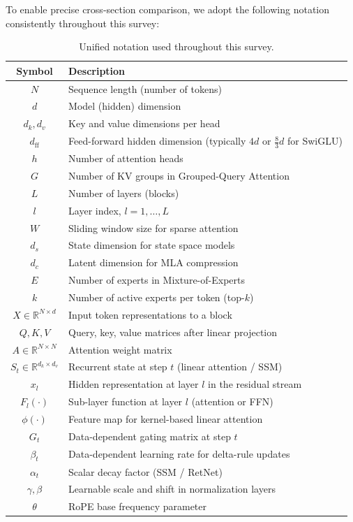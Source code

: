 \documentclass[11pt, a4paper]{article}
\begin{document}
To enable precise cross-section comparison, we adopt the following notation consistently throughout this survey:

\begin{table}[h]
\centering
\small
\caption{Unified notation used throughout this survey.}
\label{tab:notation}
\begin{tabular}{cl}
\toprule
\textbf{Symbol} & \textbf{Description} \\
\midrule
$N$ & Sequence length (number of tokens) \\
$d$ & Model (hidden) dimension \\
$d_k, d_v$ & Key and value dimensions per head \\
$d_{\mathrm{ff}}$ & Feed-forward hidden dimension (typically $4d$ or $\tfrac{8}{3}d$ for SwiGLU) \\
$h$ & Number of attention heads \\
$G$ & Number of KV groups in Grouped-Query Attention \\
$L$ & Number of layers (blocks) \\
$l$ & Layer index, $l = 1, \ldots, L$ \\
$W$ & Sliding window size for sparse attention \\
$d_s$ & State dimension for state space models \\
$d_c$ & Latent dimension for MLA compression \\
$E$ & Number of experts in Mixture-of-Experts \\
$k$ & Number of active experts per token (top-$k$) \\
\midrule
$X \in \mathbb{R}^{N \times d}$ & Input token representations to a block \\
$Q, K, V$ & Query, key, value matrices after linear projection \\
$A \in \mathbb{R}^{N \times N}$ & Attention weight matrix \\
$S_t \in \mathbb{R}^{d_k \times d_v}$ & Recurrent state at step $t$ (linear attention / SSM) \\
$x_l$ & Hidden representation at layer $l$ in the residual stream \\
$F_l(\cdot)$ & Sub-layer function at layer $l$ (attention or FFN) \\
\midrule
$\phi(\cdot)$ & Feature map for kernel-based linear attention \\
$G_t$ & Data-dependent gating matrix at step $t$ \\
$\beta_t$ & Data-dependent learning rate for delta-rule updates \\
$\alpha_t$ & Scalar decay factor (SSM / RetNet) \\
$\gamma, \beta$ & Learnable scale and shift in normalization layers \\
$\theta$ & RoPE base frequency parameter \\
\bottomrule
\end{tabular}
\end{table}
\end{document}
